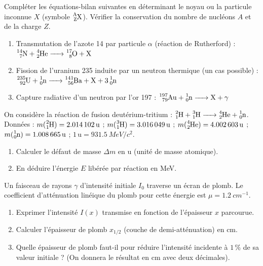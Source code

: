 \documentclass[11pt]{article}
\begin{document}
\begin{exercice}
Compléter les équations-bilan suivantes en déterminant le noyau ou la particule inconnue $X$ (symbole $\ce{^A_ZX}$). Vérifier la conservation du nombre de nucléons $A$ et de la charge $Z$.
\begin{enumerate}
    \item Transmutation de l'azote 14 par particule $\alpha$ (réaction de Rutherford) :
    $\ce{^14_7N + ^4_2He -> ^{17}_8O + X}$
    \item Fission de l'uranium 235 induite par un neutron thermique (un cas possible) :
    $\ce{^235_92U + ^1_0n -> ^141_56Ba + X + 3 ^1_0n}$
    \item Capture radiative d'un neutron par l'or 197 :
    $\ce{^197_79Au + ^1_0n -> X + \gamma}$
\end{enumerate}
\end{exercice}

\begin{exercice}
On considère la réaction de fusion deutérium-tritium :
$\ce{^2_1H + ^3_1H -> ^4_2He + ^1_0n}$.
Données : $m(\ce{^2_1H}) = \SI{2,014102}{u}$ ; $m(\ce{^3_1H}) = \SI{3,016049}{u}$ ; $m(\ce{^4_2He}) = \SI{4,002603}{u}$ ; $m(\ce{^1_0n}) = \SI{1,008665}{u}$ ; $1\,\text{u} = \SI{931,5}{MeV/c^2}$.
\begin{enumerate}
    \item Calculer le défaut de masse $\Delta m$ en u (unité de masse atomique).
    \item En déduire l'énergie $E$ libérée par réaction en MeV.
\end{enumerate}
\end{exercice}

\begin{exercice}
Un faisceau de rayons $\gamma$ d'intensité initiale $I_0$ traverse un écran de plomb. Le coefficient d'atténuation linéique du plomb pour cette énergie est $\mu = \SI{1,2}{cm^{-1}}$.
\begin{enumerate}
    \item Exprimer l'intensité $I(x)$ transmise en fonction de l'épaisseur $x$ parcourue.
    \item Calculer l'épaisseur de plomb $x_{1/2}$ (couche de demi-atténuation) en cm.
    \item Quelle épaisseur de plomb faut-il pour réduire l'intensité incidente à $1\,\%$ de sa valeur initiale ? (On donnera le résultat en cm avec deux décimales).
\end{enumerate}
\end{exercice}
\end{document}
